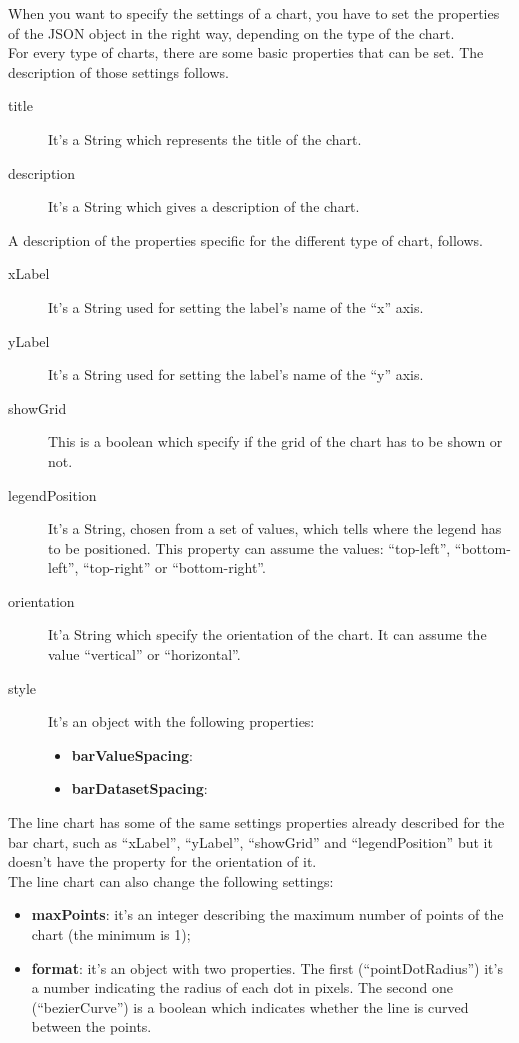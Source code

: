 	When you want to specify the settings of a chart, you have to set the properties of the JSON object in the right way, depending on the type of the chart.\\
	For every type of charts, there are some basic properties that can be set. The description of those settings follows.
	\begin{description}
			\item[title] It's a String which represents the title of the chart.
			\item[description] It's a String which gives a description of the chart.
	\end{description}
	A description of the properties specific for the different type of chart, follows.
		\begin{description}
			\item[xLabel] It's a String used for setting the label's name of the “x” axis.
			\item[yLabel] It's a String used for setting the label's name of the “y” axis.
			\item[showGrid] This is a boolean which specify if the grid of the chart has to be shown or not.
			\item[legendPosition] It's a String, chosen from a set of values, which tells where the legend has to be positioned. This property can assume the values: “top-left”, “bottom-left”, “top-right” or “bottom-right”.
			\item[orientation] It'a String which specify the orientation of the chart. It can assume the value “vertical” or “horizontal”.
			\item[style] It's an object with the following properties:
			\begin{itemize}
				\item \textbf{barValueSpacing}: 
				\item \textbf{barDatasetSpacing}:
			\end{itemize}
		\end{description}
		The line chart has some of the same settings properties already described for the bar chart, such as “xLabel”, “yLabel”, “showGrid” and “legendPosition” but it doesn't have the property for the orientation of it. \\
		The line chart can also change the following settings:
		\begin{itemize}
			\item \textbf{maxPoints}: it's an integer describing the maximum number of points of the chart (the minimum is 1);
			\item \textbf{format}: it's an object with two properties. The first (“pointDotRadius”) it's a number indicating the radius of each dot in pixels. The second one (“bezierCurve”) is a boolean which indicates whether the line is curved between the points.
		\end{itemize}
